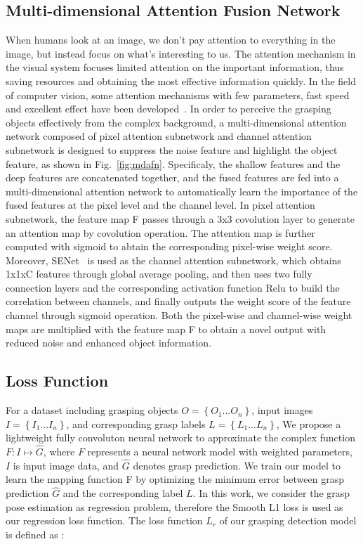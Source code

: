 \documentclass[journal]{IEEEtran}
\begin{document}
\subsection{Multi-dimensional Attention Fusion Network}
\label{sec:MDAFN}
When humans look at an image, we don't pay attention to everything in the image, but instead focus on what's interesting to us. The attention mechanism in the visual system focuses limited attention on the important information, thus saving resources and obtaining the most effective information quickly. In the field of computer vision, some attention mechanisms with few parameters, fast speed and excellent effect have been developed~\cite{nonlocal,senet,cbam,sknet}. In order to perceive the grasping objects effectively from the complex background, a multi-dimensional attention network composed of pixel attention subnetwork and channel attention subnetwork is designed to suppress the noise feature and highlight the object feature, as shown in Fig.~\ref{fig:mdafn}. Specificaly, the shallow features and the deep features are concatenated together, and the fused features are fed into a multi-dimensional attention network to automatically learn the importance of the fused features at  the pixel level and the channel level. In pixel attention subnetwork, the feature map F passes through a 3x3 covolution layer to generate an attention map by covolution operation. The attention map is further computed with sigmoid to abtain the corresponding pixel-wise weight score. Moreover, SENet~\cite{senet} is used as the channel attention subnetwork, which obtains 1x1xC features through global average pooling, and then uses two fully connection layers and the corresponding activation function Relu to build the correlation between channels, and finally outputs the weight score of the feature channel through sigmoid operation. Both the pixel-wise and channel-wise weight maps are multiplied with the feature map F to obtain a novel output with reduced noise and enhanced object information.



\subsection{Loss Function}
For a dataset including grasping objects $O = \left\{O_1...O_n\right\}$, input images $I = \left\{I_1...I_n\right\}$, and corresponding grasp labels $L = \left\{L_1...L_n\right\}$, We propose a lightweight fully convoluton neural network to approximate the complex function $F: I \longmapsto \hat{G}$, where $F$ represents a neural network model with weighted parameters, $I$ is input image data, and  $\hat{G}$ denotes grasp prediction. We train our model to learn the mapping function F by optimizing the minimum error between grasp prediction $\hat{G}$ and the corresponding label $L$. In this work, we consider the grasp pose estimation as regression problem, therefore the Smooth L1 loss is used as our regression loss function. The loss function $L_r$ of our grasping detection model is defined as :
\end{document}
